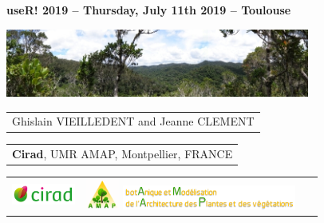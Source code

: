 {

  \begin{frame}
    \begin{center}
      \small{\textbf{useR! 2019 -- Thursday, July 11th 2019 -- Toulouse}}
    \end{center}
    \vspace{-0.5cm}
    \titlepage %
    \vspace{-2.5cm}
    \begin{center}
      \includegraphics[width=10cm]{figs/Banniere.png}
    \end{center}
    \begin{center}

        \begin{tabular}{c}
          Ghislain VIEILLEDENT and 
          Jeanne CLEMENT
        \end{tabular}

      \vspace{0.25cm}

        \begin{tabular}{c}
          \textbf{Cirad}, UMR AMAP, Montpellier, FRANCE 
        \end{tabular}

      \vspace{0.25cm}

      \begin{tabular}{C{2cm}C{2cm}C{3cm}}
        \includegraphics[height=0.7cm]{figs/logo_Cirad.png} &
        \includegraphics[height=1cm]{figs/logo_AMAP.png} 
        \includegraphics[height=0.8cm]{figs/AMAP-titre-long.png} &
        ~
      \end{tabular}

    \end{center}

  \end{frame}
}
\setcounter{framenumber}{0}
% 

